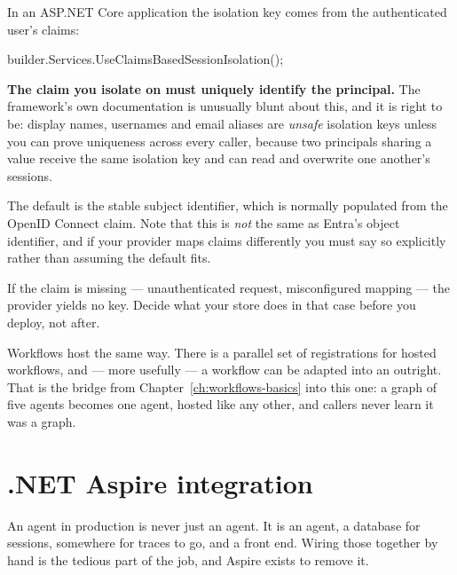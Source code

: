 In an ASP.NET Core application the isolation key comes from the authenticated
user's claims:

\begin{csharp}[caption={Isolating sessions by principal}, label={lst:host-isolation}]
builder.Services.UseClaimsBasedSessionIsolation();
\end{csharp}

\begin{warning}
\textbf{The claim you isolate on must uniquely identify the principal.} The
framework's own documentation is unusually blunt about this, and it is right to
be: display names, usernames and email aliases are \emph{unsafe} isolation keys
unless you can prove uniqueness across every caller, because two principals
sharing a value receive the same isolation key and can read and overwrite one
another's sessions.

The default is the stable subject identifier, which is normally populated from
the OpenID Connect  claim. Note that this is \emph{not} the same as
Entra's object identifier, and if your provider maps claims differently you must
say so explicitly rather than assuming the default fits.

If the claim is missing --- unauthenticated request, misconfigured mapping --- the
provider yields no key. Decide what your store does in that case before you
deploy, not after.
\end{warning}

\begin{note}
Workflows host the same way. There is a parallel set of registrations for hosted
workflows, and --- more usefully --- a workflow can be adapted into an
 outright. That is the bridge from Chapter~\ref{ch:workflows-basics}
into this one: a graph of five agents becomes one agent, hosted like any other,
and callers never learn it was a graph.
\end{note}

\section{.NET Aspire integration}
\label{sec:host-aspire}

An agent in production is never just an agent. It is an agent, a database for
sessions, somewhere for traces to go, and a front end. Wiring those together by
hand is the tedious part of the job, and Aspire exists to remove it.

